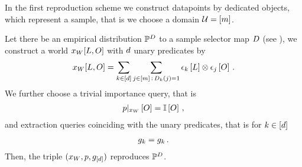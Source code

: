 %





In the first reproduction scheme we construct datapoints by dedicated objects, which represent a sample, that is we choose a domain $\mathcal{U}=[m]$.

\begin{theorem}
    \label{the:reproducingSingleObjects}
    Let there be an empirical distribution $\mathbb{P}^{D}$ to a sample selector map $D$ (see ), we construct a world $x_{W}[L,O]$ with $d$ unary predicates by
    \begin{align*}
        x_{W}[{L,O}]
        = \sum_{k\in[d]} \sum_{j\in[m] \,:\, D_{k}(j)=1} \epsilon_{k}\left[L\right] \otimes \epsilon_{j}\left[O\right] \, .
    \end{align*}
    We further choose a trivial importance query, that is
    \begin{align*}
        {p}|_{x_{W}} \left[O\right] = \mathbb{I}\left[O\right] \, ,
    \end{align*}
    and extraction queries coinciding with the unary predicates, that is for $k\in[d]$
    \begin{align*}
        g_{k} = g_{k} \, .
    \end{align*}
    Then, the triple $(x_{W},p,g_{[d]})$ reproduces $\mathbb{P}^{D}$.
\end{theorem}
